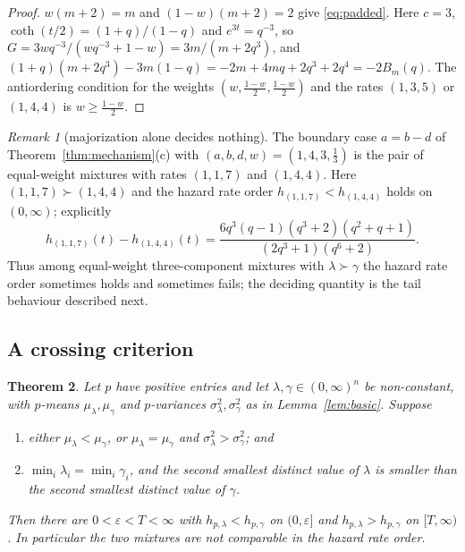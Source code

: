 \documentclass[10pt]{article}
\theoremstyle{plain}
\newtheorem{theorem}{Theorem}[section]
\theoremstyle{definition}
\theoremstyle{remark}
\newtheorem{remark}[theorem]{Remark}
\begin{document}
\begin{proof}
$w(m+2)=m$ and $(1-w)(m+2)=2$ give \eqref{eq:padded}. Here $c=3$, $\coth(t/2)=(1+q)/(1-q)$ and $e^{3t}=q^{-3}$, so $G=3wq^{-3}/(wq^{-3}+1-w)=3m/(m+2q^3)$, and $(1+q)(m+2q^3)-3m(1-q)=-2m+4mq+2q^3+2q^4=-2B_m(q)$. The antiordering condition for the weights $(w,\tfrac{1-w}{2},\tfrac{1-w}{2})$ and the rates $(1,3,5)$ or $(1,4,4)$ is $w\ge\tfrac{1-w}{2}$.
\end{proof}

\begin{remark}[majorization alone decides nothing]\label{rem:117}
The boundary case $a=b-d$ of Theorem~\ref{thm:mechanism}(c) with $(a,b,d,w)=(1,4,3,\tfrac13)$ is the pair of equal-weight mixtures with rates $(1,1,7)$ and $(1,4,4)$. Here $(1,1,7)\succ(1,4,4)$ and the hazard rate order $h_{(1,1,7)}<h_{(1,4,4)}$ holds on $(0,\infty)$; explicitly
\[
h_{(1,1,7)}(t)-h_{(1,4,4)}(t)=\frac{6q^3(q-1)(q^3+2)(q^2+q+1)}{(2q^3+1)(q^6+2)} .
\]
Thus among equal-weight three-component mixtures with $\lambda\succ\gamma$ the hazard rate order sometimes holds and sometimes fails; the deciding quantity is the tail behaviour described next.
\end{remark}

\subsection{A crossing criterion}

\begin{theorem}\label{thm:criterion}
Let $p$ have positive entries and let $\lambda,\gamma\in(0,\infty)^n$ be non-constant, with $p$-means $\mu_\lambda,\mu_\gamma$ and $p$-variances $\sigma_\lambda^2,\sigma_\gamma^2$ as in Lemma~\ref{lem:basic}. Suppose
\begin{enumerate}
\item[(A)] either $\mu_\lambda<\mu_\gamma$, or $\mu_\lambda=\mu_\gamma$ and $\sigma^2_\lambda>\sigma^2_\gamma$; and
\item[(B)] $\min_i\lambda_i=\min_i\gamma_i$, and the second smallest distinct value of $\lambda$ is smaller than the second smallest distinct value of $\gamma$.
\end{enumerate}
Then there are $0<\varepsilon<T<\infty$ with $h_{p,\lambda}<h_{p,\gamma}$ on $(0,\varepsilon]$ and $h_{p,\lambda}>h_{p,\gamma}$ on $[T,\infty)$. In particular the two mixtures are not comparable in the hazard rate order.
\end{theorem}
\end{document}
